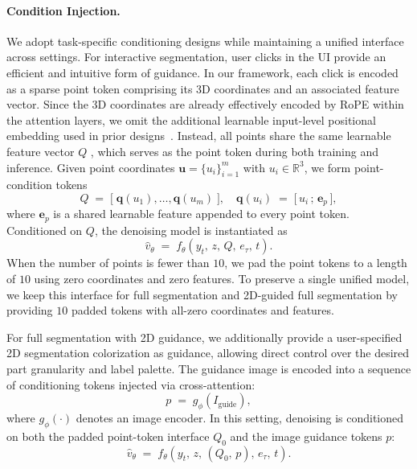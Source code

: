 \paragraph{Condition Injection.}
We adopt task-specific conditioning designs while maintaining a unified interface across settings.
%
For interactive segmentation, user clicks in the UI provide an efficient and intuitive form of guidance.
%
In our framework, each click is encoded as a sparse point token comprising its 3D coordinates and an associated feature vector.
%
Since the 3D coordinates are already effectively encoded by RoPE within the attention layers, 
%
we omit the additional learnable input-level positional embedding used in prior designs~\cite{p3sam}.
%
Instead, all points share the same learnable feature vector $Q$ , which serves as the point token during both training and inference.
%
Given point coordinates $\mathbf{u}=\{u_i\}_{i=1}^{m}$ with $u_i\in\mathbb{R}^3$, we form point-condition tokens
\begin{equation}
Q \;=\; \big[\; \mathbf{q}(u_1),\ldots,\mathbf{q}(u_m) \;\big], 
\quad
\mathbf{q}(u_i) \;=\; \big[\, u_i \,;\, \mathbf{e}_p \,\big],
\end{equation}
where $\mathbf{e}_p$ is a shared learnable feature appended to every point token.
%
Conditioned on $Q$, the denoising model is instantiated as
\begin{equation}
\hat{v}_{\theta} \;=\; f_{\theta}\!\left(y_t,\, z,\, Q,\, e_{\tau},\, t\right).
\end{equation}
%
When the number of points is fewer than $10$, we pad the point tokens to a length of $10$
using zero coordinates and zero features.
%
To preserve a single unified model, we keep this interface for full segmentation and 2D-guided full segmentation by providing $10$ padded tokens with all-zero coordinates and features.


For full segmentation with 2D guidance, we additionally provide a user-specified 2D segmentation colorization as guidance, allowing direct control over the desired part granularity and label palette.
%
The guidance image is encoded into a sequence of conditioning tokens injected via cross-attention:
\begin{equation}
p \;=\; g_{\phi}(I_{\text{guide}}),
\end{equation}
where $g_{\phi}(\cdot)$ denotes an image encoder.
%
In this setting, denoising is conditioned on both the padded point-token interface $Q_{0}$ and the image guidance tokens $p$:
\begin{equation}
\hat{v}_{\theta} \;=\; f_{\theta}\!\left(y_t,\, z,\, (Q_{0},\, p),\, e_{\tau},\, t\right).
\end{equation}


